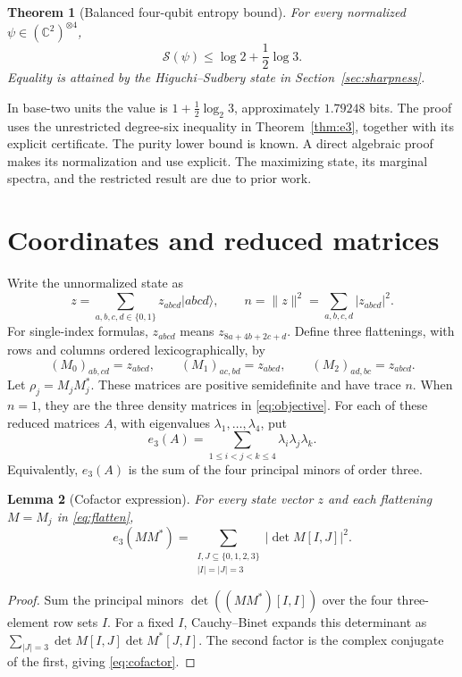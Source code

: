 \documentclass[11pt]{article}
\newtheorem{theorem}{Theorem}[section]
\newtheorem{lemma}[theorem]{Lemma}
\theoremstyle{definition}
\theoremstyle{remark}
\newcommand{\C}{\mathbb C}
\newcommand{\ket}[1]{\lvert #1\rangle}
\begin{document}
\begin{theorem}[Balanced four-qubit entropy bound]
\label{thm:main}
For every normalized $\psi\in(\C^2)^{\otimes4}$,
\begin{equation}
 \mathcal S(\psi)\leq\log2+\frac12\log3.
 \label{eq:main}
\end{equation}
Equality is attained by the Higuchi--Sudbery state in
Section~\ref{sec:sharpness}.
\end{theorem}

In base-two units the value is $1+\tfrac12\log_2 3$, approximately
$1.79248$ bits. The proof uses the unrestricted degree-six inequality in Theorem~\ref{thm:e3}, together with
its explicit certificate. The purity lower bound is known. A direct algebraic proof makes its normalization and use explicit. The maximizing state, its marginal spectra, and the restricted result are due to prior work.

\section{Coordinates and reduced matrices}

Write the unnormalized state as
\[
 z=\sum_{a,b,c,d\in\{0,1\}}z_{abcd}\ket{abcd},
 \qquad
 n=\|z\|^2=\sum_{a,b,c,d}|z_{abcd}|^2.
\]
For single-index formulas, $z_{abcd}$ means $z_{8a+4b+2c+d}$.
Define three flattenings, with rows and columns ordered lexicographically,
by
\begin{equation}
 (M_0)_{ab,cd}=z_{abcd},\qquad
 (M_1)_{ac,bd}=z_{abcd},\qquad
 (M_2)_{ad,bc}=z_{abcd}.
 \label{eq:flatten}
\end{equation}
Let $\rho_j=M_jM_j^*$. These matrices are positive semidefinite and have
trace $n$. When $n=1$, they are the three density matrices in
\eqref{eq:objective}. For each of these reduced matrices $A$, with
eigenvalues $\lambda_1,\ldots,\lambda_4$, put
\[
 e_3(A)=\sum_{1\leq i<j<k\leq4}\lambda_i\lambda_j\lambda_k.
\]
Equivalently, $e_3(A)$ is the sum of the four principal minors of order
three.

\begin{lemma}[Cofactor expression]
\label{lem:cofactor}
For every state vector $z$ and each flattening $M=M_j$ in
\eqref{eq:flatten},
\begin{equation}
 e_3(MM^*)=\sum_{\substack{I,J\subseteq\{0,1,2,3\}\\|I|=|J|=3}}
       |\det M[I,J]|^2.
 \label{eq:cofactor}
\end{equation}
\end{lemma}
\begin{proof}
Sum the principal minors $\det((MM^*)[I,I])$ over the four three-element
row sets $I$. For a fixed $I$, Cauchy--Binet expands this determinant as
$\sum_{|J|=3}\det M[I,J]\det M^*[J,I]$. The second factor is the
complex conjugate of the first, giving \eqref{eq:cofactor}.
\end{proof}
\end{document}
